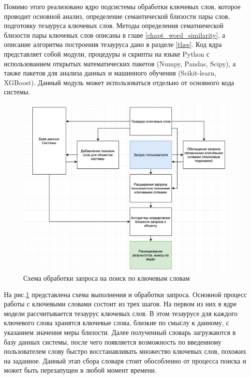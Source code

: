 Помимо этого реализовано ядро подсистемы обработки ключевых слов, которое проводит основной анализ, определение семантической близости пары слов, подготовку тезауруса ключевых слов. Методы определения сематнической близости пары ключевых слов описаны в главе \ref{chapt_word_similarity}, а описание алгоритма построения тезауруса дано в разделе \ref{thes}. Код ядра представляет собой модули, процедуры и скрипты на языке Python с использованием открытых математических пакетов (Numpy, Pandas, Scipy), а также пакетов для анализа данных и машинного обучения (Scikit-learn, XGBoost). Данный модуль может использоваться отдельно от основного кода системы.

\begin{figure}[ht]
  \begin{minipage}[ht]{1.0\linewidth}\centering
    \includegraphics[width=0.95\linewidth]{Dissertation/pics/search_2}
    \caption{Схема обработки запроса на поиск по ключевым словам}
  \end{minipage}
  \label{img:search_2}
\end{figure}

На рис.\ref{img:search_2} представлена схема выполнения и обработки запроса. Основной процесс работы с ключевыми словами состоит из трех шагов. На первом из них в ядре модели рассчитывается тезаурус ключевых слов. В этом тезаурусе для каждого ключевого слова хранятся ключевые слова, близкие по смыслу к данному, с указанием значения меры близости. Далее полученный словарь загружаются в базу данных системы, после чего появляется возможность по введенному пользователем слову быстро восстанавливать множество ключевых слов, похожих на заданное. Данный этап сбора словаря стоит обособленно от процесса поиска и может быть перезапущен в любой момент времени. 

